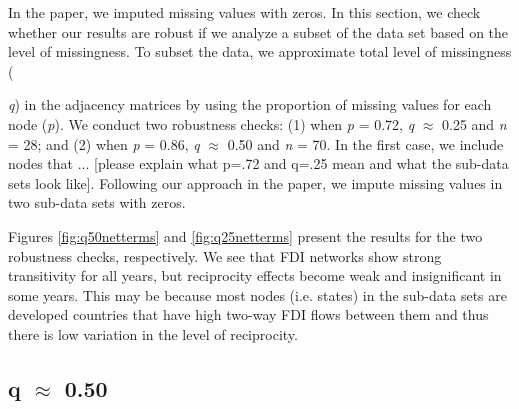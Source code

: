 \documentclass[reqno,onecolumn,letterpaper,12pt]{article}
\begin{document}
In the paper, we imputed missing values with zeros. In this section, we check whether our results are robust if we analyze a subset of the data set based on the level of missingness. To subset the data, we approximate total level of missingness ({\emph{q}) in the adjacency matrices by using the proportion of missing values for each node (\emph{p}). We conduct two robustness checks: (1) when \emph{p} = 0.72, \emph{q} $\approx$ 0.25 and  \emph{n} = 28; and (2) when \emph{p} = 0.86,  \emph{q} $\approx$ 0.50 and  \emph{n} = 70. In the first case, we include nodes that ... {\color{red}[please explain what p=.72 and q=.25 mean and what the sub-data sets look like].}   Following our approach in the paper, we impute missing values in two sub-data sets with zeros.

Figures \ref{fig:q50netterms} and \ref{fig:q25netterms} present the results for the two robustness checks, respectively. We see that FDI networks show strong transitivity for all years, {\color{red}but reciprocity effects become weak and insignificant in some years. This may be because most nodes (i.e. states) in the sub-data sets are developed countries that have high two-way FDI flows between them and thus there is low variation in the level of reciprocity.}

\subsection{q $\approx$  0.50}

}
\end{document}
